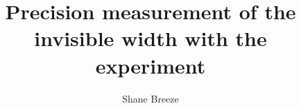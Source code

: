 \documentclass[hyperpdf,bindnopdf,11pt]{hepthesis}
\title{Precision measurement of the \PZ invisible width with the \CMS experiment}
\author{Shane Breeze}
\begin{document}
    \begin{frontmatter}
        
        
        
        
        
        
    \end{frontmatter}

    \begin{mainmatter}
        \cleardoublepage
        
        
        
        
        
        
        
        
    \end{mainmatter}

    \begin{appendices}
        
    \end{appendices}

    \begin{backmatter}
        
    \end{backmatter}
\end{document}
